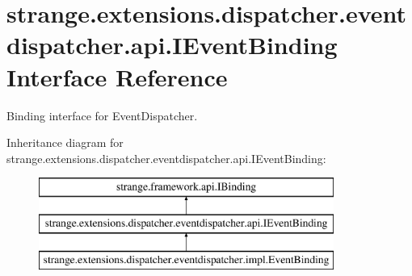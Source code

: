 \hypertarget{interfacestrange_1_1extensions_1_1dispatcher_1_1eventdispatcher_1_1api_1_1_i_event_binding}{\section{strange.\-extensions.\-dispatcher.\-eventdispatcher.\-api.\-I\-Event\-Binding Interface Reference}
\label{interfacestrange_1_1extensions_1_1dispatcher_1_1eventdispatcher_1_1api_1_1_i_event_binding}
}


Binding interface for Event\-Dispatcher.  


Inheritance diagram for strange.\-extensions.\-dispatcher.\-eventdispatcher.\-api.\-I\-Event\-Binding\-:\begin{figure}[H]
\begin{center}
\leavevmode
\includegraphics[height=3.000000cm]{interfacestrange_1_1extensions_1_1dispatcher_1_1eventdispatcher_1_1api_1_1_i_event_binding}
\end{center}
\end{figure}
